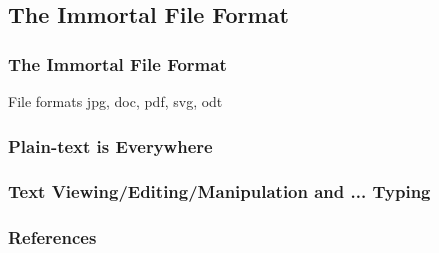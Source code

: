 \documentclass{beamer}
\begin{document}


\subsection{The Immortal File Format}


\begin{frame}
  \frametitle{The Immortal File Format}

  \begin{block}{File formats}
    jpg, doc, pdf, svg, odt
  \end{block}

\end{frame}

\begin{frame}
  \frametitle{Plain-text is Everywhere}


\end{frame}

\begin{frame}
  \frametitle{Text Viewing/Editing/Manipulation and ... Typing}



\end{frame}



\begin{frame}
  \frametitle{References}
  \tiny{
    \begin{thebibliography}{99}


    \end{thebibliography}
  }
\end{frame}

\end{document}
